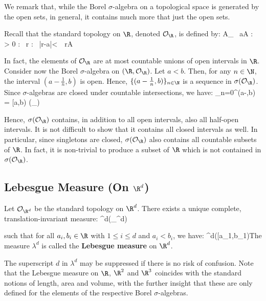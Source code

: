 We remark that, while the Borel $\sigma$-algebra on a topological space is generated by the open sets, in general, it
contains much more that just the open sets.

\be
Recall that the standard topology on $\R$, denoted $\mathcal{O}_{\R}$, is defined by:
\bse
A\in {}_{\R} \quad \Leftrightarrow \quad \forall \, a\in A : \exists \, \varepsilon > 0 : \forall \, r \in
\R : \ |r-a|<\varepsilon \, \Rightarrow\, r\in A
\ese

In fact, the elements of $\mathcal{O}_{\R}$ are at most countable unions of open intervals in $\R$. Consider now the
Borel $\sigma$-algebra on $(\R,\mathcal{O}_{\R})$. Let $a<b$. Then, for any $n\in \N$, the interval $(a-\tfrac{1}{n},
b)$ is open. Hence, $\{(a-\tfrac{1}{n},b)\}_{n\in \N}$ is a sequence in $\sigma(\mathcal{O}_{\R})$. Since
$\sigma$-algebras are closed under countable intersections, we have:
\bse
\bigcap_{n=0}^{\infty}(a-,b) = [a,b) \in \sigma(_{\R})
\ese

Hence, $\sigma(\mathcal{O}_{\R})$ contains, in addition to all open intervals, also all half-open intervals. It is
not difficult to show that it contains all closed intervals as well. In particular, since singletons are closed,
$\sigma(\mathcal{O}_{\R})$ also contains all countable subsets of $\R$. In fact, it is non-trivial to produce a
subset of $\R$ which is not contained in $\sigma(\mathcal{O}_{\R})$.
\ee

\subsection{Lebesgue Measure (On $\R^d$)}

\bt[]
Let $\mathcal{O}_{\R^d}$ be the standard topology on $\R^d$. There exists a unique complete, translation-invariant
measure:
\bse
\lambda^d\cl\sigma(_{\R^d})\to[0,\infty]
\ese

such that for all $a_i,b_i\in\R$ with $1\leq i\leq d$ and $a_i<b_i$, we have:
\bse
\lambda^d\bigl([a_1,b_1)\times\cdots\times[a_d,b_d)\bigr) = \prod_{i=1}^d(b_i-a_i)
\ese
\et

\bd [Lebesgue Measure]
The measure $\lambda^d$ is called the \textbf{Lebesgue measure} on $\R^d$.
\ed

The superscript $d$ in $\lambda^d$ may be suppressed if there is no risk of confusion. Note that the Lebesgue measure
on $\R$, $\R^2$ and $\R^3$ coincides with the standard notions of length, area and volume, with the further insight
that these are only defined for the elements of the respective Borel $\sigma$-algebras.

